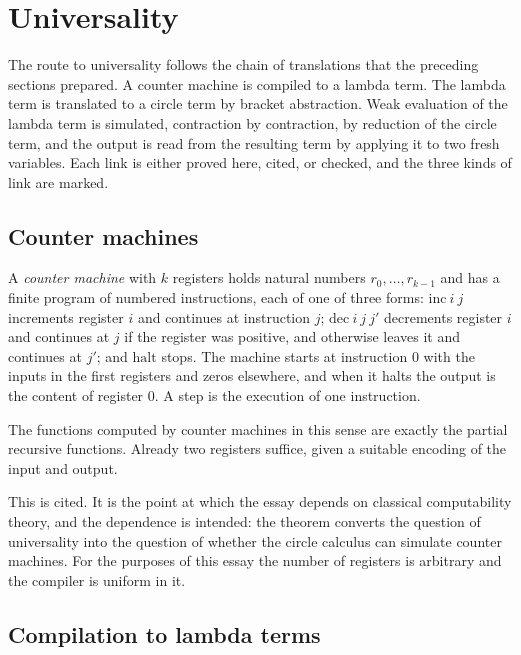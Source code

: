 \section{Universality}\label{sec:universality}

The route to universality follows the chain of translations that the preceding sections prepared. A counter machine is compiled to a lambda term. The lambda term is translated to a circle term by bracket abstraction. Weak evaluation of the lambda term is simulated, contraction by contraction, by reduction of the circle term, and the output is read from the resulting term by applying it to two fresh variables. Each link is either proved here, cited, or checked, and the three kinds of link are marked.

\subsection{Counter machines}

A \emph{counter machine} with $k$ registers holds natural numbers $r_0,\dots,r_{k-1}$ and has a finite program of numbered instructions, each of one of three forms: $\mathrm{inc}\ i\ j$ increments register $i$ and continues at instruction $j$; $\mathrm{dec}\ i\ j\ j'$ decrements register $i$ and continues at $j$ if the register was positive, and otherwise leaves it and continues at $j'$; and $\mathrm{halt}$ stops. The machine starts at instruction $0$ with the inputs in the first registers and zeros elsewhere, and when it halts the output is the content of register $0$. A step is the execution of one instruction.

\begin{theorem}\label{thm:minsky}
The functions computed by counter machines in this sense are exactly the partial recursive functions. Already two registers suffice, given a suitable encoding of the input and output.
\end{theorem}

This is cited. It is the point at which the essay depends on classical computability theory, and the dependence is intended: the theorem converts the question of universality into the question of whether the circle calculus can simulate counter machines. For the purposes of this essay the number of registers is arbitrary and the compiler is uniform in it.

\subsection{Compilation to lambda terms}


